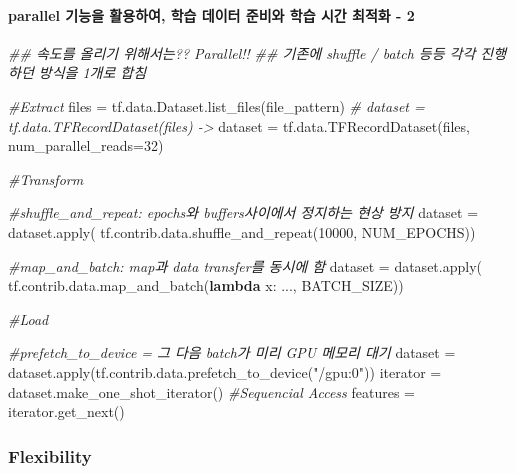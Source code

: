 \documentclass[11pt]{article}
\newenvironment{Shaded}{}{}
\newcommand{\KeywordTok}[1]{\textcolor[rgb]{0.00,0.44,0.13}{\textbf{{#1}}}}
\newcommand{\DecValTok}[1]{\textcolor[rgb]{0.25,0.63,0.44}{{#1}}}
\newcommand{\StringTok}[1]{\textcolor[rgb]{0.25,0.44,0.63}{{#1}}}
\newcommand{\CommentTok}[1]{\textcolor[rgb]{0.38,0.63,0.69}{\textit{{#1}}}}
\newcommand{\NormalTok}[1]{{#1}}
\newcommand{\OperatorTok}[1]{\textcolor[rgb]{0.40,0.40,0.40}{{#1}}}
\newcommand{\BuiltInTok}[1]{{#1}}
\begin{document}
\hypertarget{parallel-uxae30uxb2a5uxc744-uxd65cuxc6a9uxd558uxc5ec-uxd559uxc2b5-uxb370uxc774uxd130-uxc900uxbe44uxc640-uxd559uxc2b5-uxc2dcuxac04-uxcd5cuxc801uxd654---2}{%
\paragraph{parallel 기능을 활용하여, 학습 데이터 준비와 학습 시간 최적화
-
2}\label{parallel-uxae30uxb2a5uxc744-uxd65cuxc6a9uxd558uxc5ec-uxd559uxc2b5-uxb370uxc774uxd130-uxc900uxbe44uxc640-uxd559uxc2b5-uxc2dcuxac04-uxcd5cuxc801uxd654---2}}

\begin{Shaded}
\begin{Highlighting}[]

\CommentTok{## 속도를 올리기 위해서는?? Parallel!!}
\CommentTok{## 기존에 shuffle / batch 등등 각각 진행하던 방식을 1개로 합침}

\CommentTok{#Extract}
\NormalTok{files }\OperatorTok{=}\NormalTok{ tf.data.Dataset.list_files(file_pattern)}
\CommentTok{# dataset = tf.data.TFRecordDataset(files) ->}
\NormalTok{dataset }\OperatorTok{=}\NormalTok{ tf.data.TFRecordDataset(files, num_parallel_reads}\OperatorTok{=}\DecValTok{32}\NormalTok{)}

\CommentTok{#Transform}

\CommentTok{#shuffle_and_repeat: epochs와 buffers사이에서 정지하는 현상 방지}
\NormalTok{dataset }\OperatorTok{=}\NormalTok{ dataset.}\BuiltInTok{apply}\NormalTok{(}
\NormalTok{    tf.contrib.data.shuffle_and_repeat(}\DecValTok{10000}\NormalTok{, NUM_EPOCHS))}

\CommentTok{#map_and_batch: map과 data transfer를 동시에 함}
\NormalTok{dataset }\OperatorTok{=}\NormalTok{ dataset.}\BuiltInTok{apply}\NormalTok{(}
\NormalTok{    tf.contrib.data.map_and_batch(}\KeywordTok{lambda}\NormalTok{ x: ..., BATCH_SIZE))}

\CommentTok{#Load}

\CommentTok{#prefetch_to_device = 그 다음 batch가 미리 GPU 메모리 대기}
\NormalTok{dataset }\OperatorTok{=}\NormalTok{ dataset.}\BuiltInTok{apply}\NormalTok{(tf.contrib.data.prefetch_to_device(}\StringTok{"/gpu:0"}\NormalTok{))}
\NormalTok{iterator }\OperatorTok{=}\NormalTok{ dataset.make_one_shot_iterator() }\CommentTok{#Sequencial Access}
\NormalTok{features }\OperatorTok{=}\NormalTok{ iterator.get_next()}
\end{Highlighting}
\end{Shaded}

    \hypertarget{flexibility}{%
\subsubsection{Flexibility}\label{flexibility}}
\end{document}
